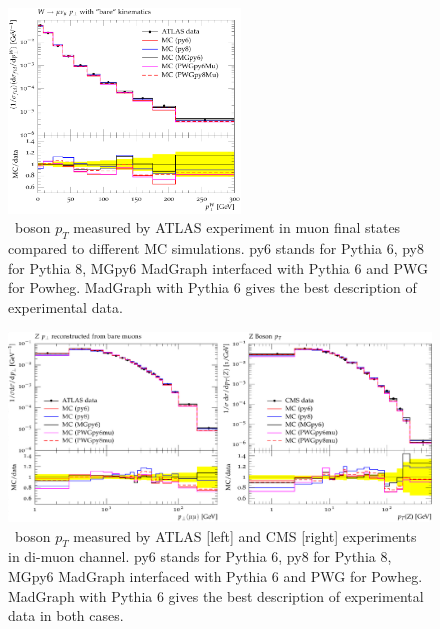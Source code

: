 \begin{figure}[!Hhtbp]
  \begin{center}
    \includegraphics[width=0.55\textwidth]{figs/Wpt_rivet.png}
    \caption{\W~boson $p_{T}$ measured by ATLAS experiment in muon final states compared to different MC simulations. py6 stands for Pythia 6, py8 for Pythia 8, MGpy6 MadGraph interfaced with Pythia 6 and PWG for Powheg. MadGraph with Pythia 6 gives the best description of experimental data.}
    \label{fig:WVal}
  \end{center}
\end{figure}

\begin{figure}[!Hhtbp]
  \begin{center}
    \includegraphics[width=1.0\textwidth]{figs/Zpt_rivet.png}
    \caption{\Z~boson $p_{T}$ measured by ATLAS [left] and CMS [right] experiments in di-muon channel. py6 stands for Pythia 6, py8 for Pythia 8, MGpy6 MadGraph interfaced with Pythia 6 and PWG for Powheg. MadGraph with Pythia 6 gives the best description of experimental data in both cases.}
    \label{fig:ZVal}
  \end{center}
\end{figure}

